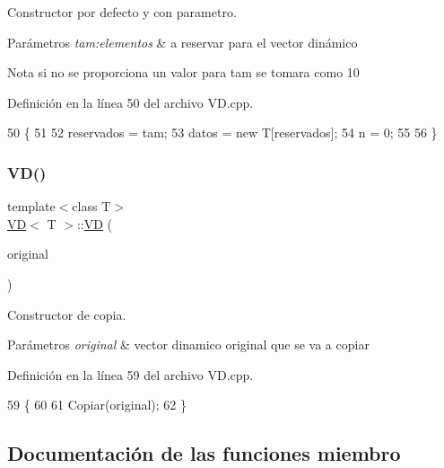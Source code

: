 Constructor por defecto y con parametro. 


\begin{DoxyParams}{Parámetros}
{\em tam\+:elementos} & a reservar para el vector dinámico \\
\hline
\end{DoxyParams}
\begin{DoxyNote}{Nota}
si no se proporciona un valor para tam se tomara como 10 
\end{DoxyNote}


Definición en la línea 50 del archivo V\+D.\+cpp.


\begin{DoxyCode}
50                 \{
51     
52     reservados = tam;
53     datos = \textcolor{keyword}{new} T[reservados];
54     n = 0;
55 
56 \}
\end{DoxyCode}
\mbox{\label{classVD_a4f22b92dd8ace25d50311ccd61508dfc}} 
\subsubsection{\texorpdfstring{V\+D()}{VD()}\hspace{0.1cm}{\footnotesize\ttfamily [2/2]}}
{\footnotesize\ttfamily template$<$class T$>$ \\
\hyperlink{classVD}{VD}$<$ T $>$\+::\hyperlink{classVD}{VD} (\begin{DoxyParamCaption}\item[{const \hyperlink{classVD}{VD}$<$ T $>$ \&}]{original }\end{DoxyParamCaption})}



Constructor de copia. 


\begin{DoxyParams}{Parámetros}
{\em original} & vector dinamico original que se va a copiar \\
\hline
\end{DoxyParams}


Definición en la línea 59 del archivo V\+D.\+cpp.


\begin{DoxyCode}
59                               \{
60     
61     Copiar(original);
62 \}
\end{DoxyCode}


\subsection{Documentación de las funciones miembro}
\mbox{\label{classVD_a033d6e246f6a49cf66a1cad25b52aa8b}} 
